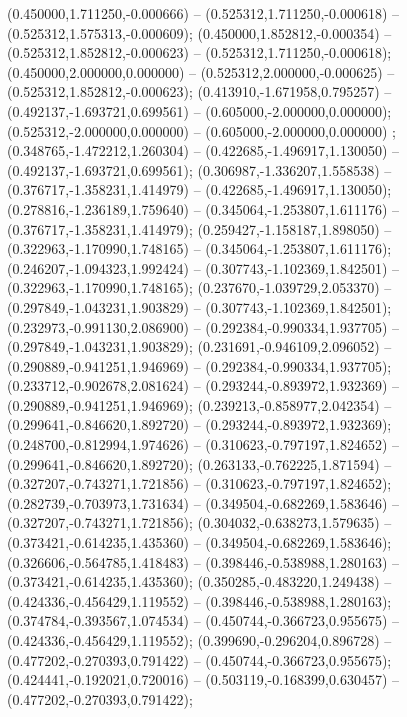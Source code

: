  (0.450000,1.711250,-0.000666) -- (0.525312,1.711250,-0.000618) -- (0.525312,1.575313,-0.000609);
 (0.450000,1.852812,-0.000354) -- (0.525312,1.852812,-0.000623) -- (0.525312,1.711250,-0.000618);
 (0.450000,2.000000,0.000000) -- (0.525312,2.000000,-0.000625) -- (0.525312,1.852812,-0.000623);
 (0.413910,-1.671958,0.795257) -- (0.492137,-1.693721,0.699561) -- (0.605000,-2.000000,0.000000);
 (0.525312,-2.000000,0.000000) -- (0.605000,-2.000000,0.000000) ;
 (0.348765,-1.472212,1.260304) -- (0.422685,-1.496917,1.130050) -- (0.492137,-1.693721,0.699561);
 (0.306987,-1.336207,1.558538) -- (0.376717,-1.358231,1.414979) -- (0.422685,-1.496917,1.130050);
 (0.278816,-1.236189,1.759640) -- (0.345064,-1.253807,1.611176) -- (0.376717,-1.358231,1.414979);
 (0.259427,-1.158187,1.898050) -- (0.322963,-1.170990,1.748165) -- (0.345064,-1.253807,1.611176);
 (0.246207,-1.094323,1.992424) -- (0.307743,-1.102369,1.842501) -- (0.322963,-1.170990,1.748165);
 (0.237670,-1.039729,2.053370) -- (0.297849,-1.043231,1.903829) -- (0.307743,-1.102369,1.842501);
 (0.232973,-0.991130,2.086900) -- (0.292384,-0.990334,1.937705) -- (0.297849,-1.043231,1.903829);
 (0.231691,-0.946109,2.096052) -- (0.290889,-0.941251,1.946969) -- (0.292384,-0.990334,1.937705);
 (0.233712,-0.902678,2.081624) -- (0.293244,-0.893972,1.932369) -- (0.290889,-0.941251,1.946969);
 (0.239213,-0.858977,2.042354) -- (0.299641,-0.846620,1.892720) -- (0.293244,-0.893972,1.932369);
 (0.248700,-0.812994,1.974626) -- (0.310623,-0.797197,1.824652) -- (0.299641,-0.846620,1.892720);
 (0.263133,-0.762225,1.871594) -- (0.327207,-0.743271,1.721856) -- (0.310623,-0.797197,1.824652);
 (0.282739,-0.703973,1.731634) -- (0.349504,-0.682269,1.583646) -- (0.327207,-0.743271,1.721856);
 (0.304032,-0.638273,1.579635) -- (0.373421,-0.614235,1.435360) -- (0.349504,-0.682269,1.583646);
 (0.326606,-0.564785,1.418483) -- (0.398446,-0.538988,1.280163) -- (0.373421,-0.614235,1.435360);
 (0.350285,-0.483220,1.249438) -- (0.424336,-0.456429,1.119552) -- (0.398446,-0.538988,1.280163);
 (0.374784,-0.393567,1.074534) -- (0.450744,-0.366723,0.955675) -- (0.424336,-0.456429,1.119552);
 (0.399690,-0.296204,0.896728) -- (0.477202,-0.270393,0.791422) -- (0.450744,-0.366723,0.955675);
 (0.424441,-0.192021,0.720016) -- (0.503119,-0.168399,0.630457) -- (0.477202,-0.270393,0.791422);
